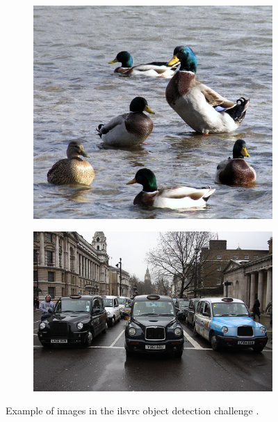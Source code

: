 \begin{figure}[H]
    \centering
    \begin{subfigure}[b]{0.4\textwidth}
        \center
        \includegraphics[width=\textwidth]{Figs/Problem/in1.jpeg}
        \caption{}\label{}
    \end{subfigure}
    \begin{subfigure}[b]{0.4\textwidth}
        \center
        \includegraphics[width=\textwidth]{Figs/Problem/in2.jpeg}
        \caption{}\label{}
    \end{subfigure}
    \caption{Example of images in the \gls{ilsvrc} object detection challenge \cite{imagenet}.}
    \label{fig:imagenet_ex}
\end{figure} 

